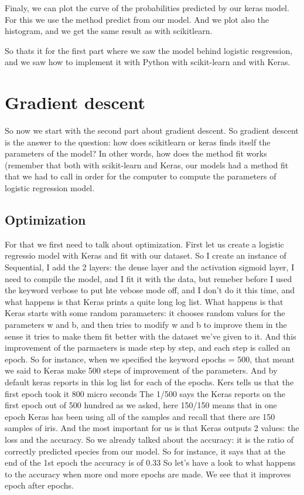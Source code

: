 \documentclass{article}
\begin{document}
Finaly, we can plot the curve of the probabilities predicted by our keras model.
For this we use the method predict from our model. 
And we plot also the histogram, and we get the same result as with scikitlearn.

So thats it for the first part where we saw the model behind logistic resgression, and 
we saw how to implement it with Python with scikit-learn and with Keras.

\section{Gradient descent}

So now we start with the second part about gradient descent.
So gradient descent is the answer to the question: 
how does scikitlearn or keras finds itself the parameters of the model?
In other words, how does the method fit works (remember that both 
with scikit-learn and Keras, our models had a method fit that we had to call in order for the computer 
to compute the parameters of logistic regression model.

\subsection{Optimization}

For that we first need to talk about optimization.
First let us create a logistic regressio model with Keras and fit with our dataset.
So I create an instance of Sequential, 
I add the 2 layers: the dense layer and the activation sigmoid layer,
I need to compile the model, 
and I fit it with the data, but remeber before I used the keyword verbose to put hte vebose mode off, 
and I don't do it this time, and what happens is that Keras prints a quite long log list.
What happens is that Keras starts with some random paramaeters: 
it chooses random values for the parameters w and b, and then tries 
to modify w and b to improve them in the sense it tries to make them fit 
better with the dataset we've given to it.
And this improvement of the parmaeters is made step by step, and each step 
is called an epoch. 
So for instance, when we specified the keyword epochs = 500, that meant 
we said to Keras make 500 steps of  improvement of the parameters.
And by default keras reports in this log list for each of the epochs.
Kers tells us that the first epoch took it 800 micro seconds
The 1/500 says the Keras reports on the first epoch out of 500 hundred as we asked,
here 150/150 means that in one epoch Keras has been using all of the samples 
and recall that there are 150 samples of iris.
And the most important for us is that Keras outputs 2 values: the loss and 
the accuracy. 
So we already talked about the accuracy: it is the ratio of correctly 
predicted species from our model. 
So for instance, it says that at the end of the 1st epoch the accuracy is of 0.33
So let's have a look to what happens to the accuracy when more ond more 
epochs are made.
We see that it improves epoch after epochs.
\end{document}
